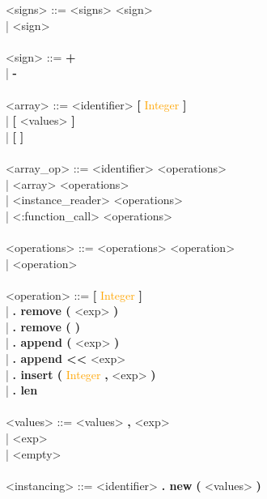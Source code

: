 \documentclass{Dokumentmall}
\begin{document}
\begin{tabbing}
  \><signs> \>::= \><signs> <sign>\\
  \> \>| \> <sign>\\\\

  \><sign> \>::= \>\textbf{+}\\
  \> \>| \> \textbf{-}\\\\

  \><array> \>::= \><identifier> \textbf{[} \textcolor{orange}{Integer} \textbf{]}\\
  \> \>| \> \textbf{[} <values> \textbf{]}\\
  \> \>| \> \textbf{[} \textbf{]}\\\\

  \><array\_op> \>::= \><identifier> <operations>\\
  \> \>| \> <array> <operations>\\
  \> \>| \> <instance\_reader> <operations>\\
  \> \>| \> <:function\_call> <operations>\\\\

  \><operations> \>::= \><operations> <operation>\\
  \> \>| \> <operation>\\\\

  \><operation> \>::= \>\textbf{[} \textcolor{orange}{Integer} \textbf{]}\\
  \> \>| \> \textbf{. remove (} <exp> \textbf{)}\\
  \> \>| \> \textbf{. remove ( )}\\
  \> \>| \> \textbf{. append (} <exp> \textbf{)}\\
  \> \>| \> \textbf{. append <{}<} <exp>\\
  \> \>| \>  \textbf{. insert (} \textcolor{orange}{Integer} \textbf{,} <exp> \textbf{)}\\
  \> \>| \>  \textbf{. len}\\\\

  \><values> \>::= \><values> \textbf{,} <exp>\\
  \> \>| \> <exp>\\
  \> \>| \> <empty>\\\\

  \><instancing> \>::= \><identifier> \textbf{. new} \textbf{(} <values> \textbf{)}\\\\


\end{tabbing}
\end{document}
